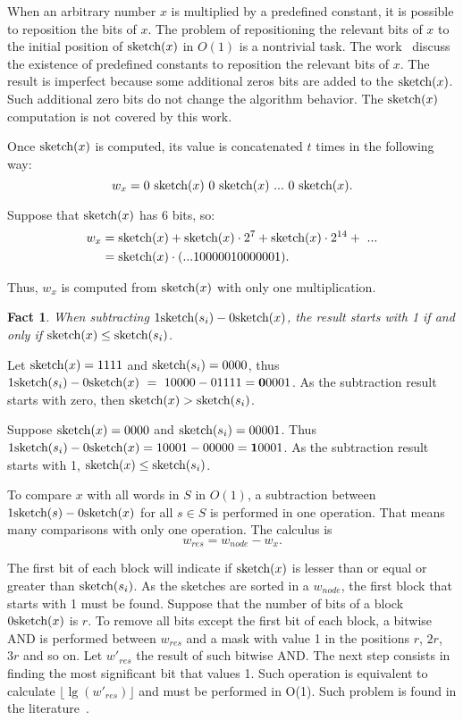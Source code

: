 \documentclass[11pt]{article}
\newtheorem{fato}{Fact}
\newcommand{\sk}[1]{\mbox{\rm{sketch}}(#1)}
\begin{document}
When an arbitrary number $x$ is multiplied by a predefined constant, it is possible to reposition the bits of $x$. The problem of repositioning the relevant bits of $x$ to the initial position of $\sk{x}$ in $O(1)$ is a nontrivial task. The work~\cite{lec2012} discuss the existence of predefined constants to reposition the relevant bits of $x$. The result is imperfect because some additional zeros bits are added to the $\sk{x}$. Such additional zero bits do not change the algorithm behavior. The $\sk{x}$ computation is not covered by this work.






Once $\sk{x}$ is computed, its value is concatenated $t$ times in the following way:
$$w_x = 0~\sk{x}~0~\sk{x} ~...~ 0~\sk{x}.$$

Suppose that $\sk{x}$ has 6 bits, so:
\begin{equation*} 
\begin{aligned}
w_x &= \sk{x} + \sk{x}\cdot 2^7 + \sk{x} \cdot 2^{14} + ~... \\
& = \sk{x}\cdot(...10000010000001).\\
\end{aligned}
\end{equation*} 


Thus, $w_x$ is computed from $\sk{x}$ with only one multiplication.


\begin{fato}
When subtracting $1\sk{s_i}-0\sk{x}$, the result starts with 1 if and only if $\sk{x}\leq \sk{s_i}$.
\end{fato}

Let $\sk{x} = 1111$ and $\sk{s_i} = 0000$, thus $1\sk{s_i} - 0\sk{x} ~ = ~ 10000 - 01111 = \mathbf{0}0001$. As the subtraction result starts with zero, then $\sk{x}>\sk{s_i}$.




Suppose $\sk{x}=0000$ and $\sk{s_i}=00001$. Thus $1\sk{s_i} - 0\sk{x} = 10001-00000 = \mathbf{1}0001$. As the subtraction result starts with 1, $ \sk{x}\leq \sk{s_i}  $.


To compare $x$ with all words in $S$ in $O(1)$, a subtraction between $1\sk{s} - 0\sk{x}$ for all  $s\in S$ is performed in one operation. That means many comparisons with only one operation.
The calculus is 
$$w_{res} = w_{node}-w_x.$$


The first bit of each block will indicate if $\sk{x}$ is lesser than or equal or greater than $\sk{s_i}$. As the sketches are sorted in a $w_{node}$, the first block that starts with 1 must be found. Suppose that the number of bits of a block $0\sk{x}$ is $r$. To remove all bits except the first bit of each block, a bitwise AND is performed between $w_{res}$ and a mask with value 1 in the positions $r$, $2r$, $3r$ and so on. Let $w'_{res}$ the result of such bitwise AND. The next step consists in finding the most significant bit that values 1. Such operation is equivalent to calculate $\lfloor\lg (w'_{res})\rfloor$ and must be performed in O(1). Such problem is found in the literature~\cite{hackers}.
\end{document}
